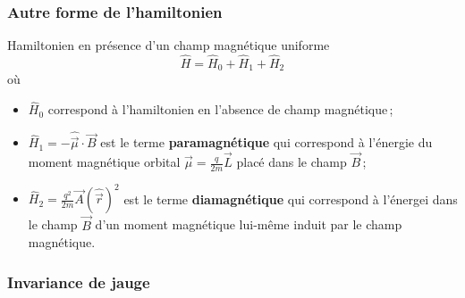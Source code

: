         \subsubsection{Autre forme de l’hamiltonien}

        \begin{omed}{Hamiltonien en présence d’un champ magnétique uniforme}
            \[ \hat{H} = \hat{H}_0 + \hat{H}_1 + \hat{H}_2 \]   
            où \begin{itemize}
                \item $\hat{H}_0$ correspond à l’hamiltonien en l’absence de champ magnétique ;
                \item $\hat{H}_1 = - \hat{\vec{\mu}} \cdot \vec{B}$ est le terme \textbf{paramagnétique} qui correspond à l’énergie du moment magnétique orbital $\vec{\mu} = \frac{q}{2m} \vec{L}$ placé dans le champ $\vec{B}$ ;
                \item $\hat{H}_2 = \frac{q^2}{2m}\vec{A}(\hat{\vec{r}})^2$ est le terme \textbf{diamagnétique} qui correspond à l’énergei dans le champ $\vec{B}$ d’un moment magnétique lui-même induit par le champ magnétique.
            \end{itemize}
        \end{omed}

        \subsubsection{Invariance de jauge}


